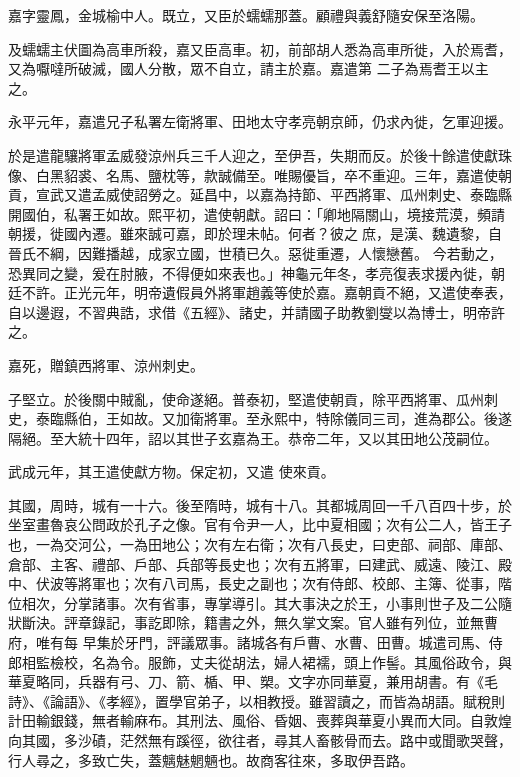 \begin{pinyinscope}
 嘉字靈鳳，金城榆中人。既立，又臣於蠕蠕那蓋。顧禮與義舒隨安保至洛陽。



 及蠕蠕主伏圖為高車所殺，嘉又臣高車。初，前部胡人悉為高車所徙，入於焉耆，又為嚈噠所破滅，國人分散，眾不自立，請主於嘉。嘉遣第
 二子為焉耆王以主之。



 永平元年，嘉遣兄子私署左衛將軍、田地太守孝亮朝京師，仍求內徙，乞軍迎援。



 於是遣龍驤將軍孟威發涼州兵三千人迎之，至伊吾，失期而反。於後十餘遣使獻珠像、白黑貂裘、名馬、鹽枕等，款誠備至。唯賜優旨，卒不重迎。三年，嘉遣使朝貢，宣武又遣孟威使詔勞之。延昌中，以嘉為持節、平西將軍、瓜州刺史、泰臨縣開國伯，私署王如故。熙平初，遣使朝獻。詔曰：「卿地隔關山，境接荒漠，頻請朝援，徙國內遷。雖來誠可嘉，即於理未帖。何者？彼之庶，是漢、魏遺黎，自晉氏不綱，因難播越，成家立國，世積已久。惡徙重遷，人懷戀舊。
 今若動之，恐異同之變，爰在肘腋，不得便如來表也。」神龜元年冬，孝亮復表求援內徙，朝廷不許。正光元年，明帝遺假員外將軍趙義等使於嘉。嘉朝貢不絕，又遣使奉表，自以邊遐，不習典誥，求借《五經》、諸史，并請國子助教劉燮以為博士，明帝許之。



 嘉死，贈鎮西將軍、涼州刺史。



 子堅立。於後關中賊亂，使命遂絕。普泰初，堅遣使朝貢，除平西將軍、瓜州刺史，泰臨縣伯，王如故。又加衛將軍。至永熙中，特除儀同三司，進為郡公。後遂隔絕。至大統十四年，詔以其世子玄嘉為王。恭帝二年，又以其田地公茂嗣位。



 武成元年，其王遣使獻方物。保定初，又遣
 使來貢。



 其國，周時，城有一十六。後至隋時，城有十八。其都城周回一千八百四十步，於坐室畫魯哀公問政於孔子之像。官有令尹一人，比中夏相國；次有公二人，皆王子也，一為交河公，一為田地公；次有左右衛；次有八長史，曰吏部、祠部、庫部、倉部、主客、禮部、戶部、兵部等長史也；次有五將軍，曰建武、威遠、陵江、殿中、伏波等將軍也；次有八司馬，長史之副也；次有侍郎、校郎、主簿、從事，階位相次，分掌諸事。次有省事，專掌導引。其大事決之於王，小事則世子及二公隨狀斷決。評章錄記，事訖即除，籍書之外，無久掌文案。官人雖有列位，並無曹府，唯有每
 早集於牙門，評議眾事。諸城各有戶曹、水曹、田曹。城遣司馬、侍郎相監檢校，名為令。服飾，丈夫從胡法，婦人裙襦，頭上作髻。其風俗政令，與華夏略同，兵器有弓、刀、箭、楯、甲、槊。文字亦同華夏，兼用胡書。有《毛詩》、《論語》、《孝經》，置學官弟子，以相教授。雖習讀之，而皆為胡語。賦稅則計田輸銀錢，無者輸麻布。其刑法、風俗、昏姻、喪葬與華夏小異而大同。自敦煌向其國，多沙磧，茫然無有蹊徑，欲往者，尋其人畜骸骨而去。路中或聞歌哭聲，行人尋之，多致亡失，蓋魑魅魍魎也。故商客往來，多取伊吾路。




\end{pinyinscope}
